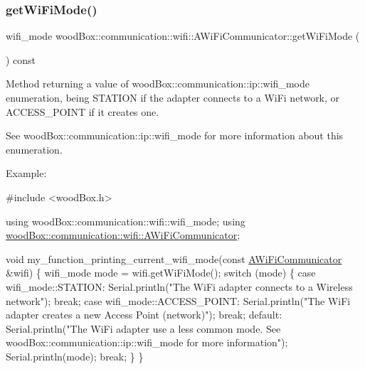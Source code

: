 \subsubsection{\texorpdfstring{get\+Wi\+Fi\+Mode()}{getWiFiMode()}}
{\footnotesize\ttfamily wifi\+\_\+mode wood\+Box\+::communication\+::wifi\+::\+A\+Wi\+Fi\+Communicator\+::get\+Wi\+Fi\+Mode (\begin{DoxyParamCaption}{ }\end{DoxyParamCaption}) const}

Method returning a value of wood\+Box\+::communication\+::ip\+::wifi\+\_\+mode enumeration, being S\+T\+A\+T\+I\+ON if the adapter connects to a Wi\+Fi network, or A\+C\+C\+E\+S\+S\+\_\+\+P\+O\+I\+NT if it creates one.

See wood\+Box\+::communication\+::ip\+::wifi\+\_\+mode for more information about this enumeration.

Example\+:


\begin{DoxyCode}
\textcolor{preprocessor}{#include <woodBox.h>}

\textcolor{keyword}{using} woodBox::communication::wifi::wifi\_mode;
\textcolor{keyword}{using} \mbox{\hyperlink{classwood_box_1_1communication_1_1wifi_1_1_a_wi_fi_communicator}{woodBox::communication::wifi::AWiFiCommunicator}};

\textcolor{keywordtype}{void} my\_function\_printing\_current\_wifi\_mode(\textcolor{keyword}{const} \mbox{\hyperlink{classwood_box_1_1communication_1_1wifi_1_1_a_wi_fi_communicator_a9d1dc13ca9243170b04211bef2b86ed2}{AWiFiCommunicator}} &wifi) \{
  wifi\_mode mode = wifi.getWiFiMode();
  \textcolor{keywordflow}{switch} (mode) \{
    \textcolor{keywordflow}{case} wifi\_mode::STATION:
      Serial.println(\textcolor{stringliteral}{"The WiFi adapter connects to a Wireless network"});
      \textcolor{keywordflow}{break};
    \textcolor{keywordflow}{case} wifi\_mode::ACCESS\_POINT:
      Serial.println(\textcolor{stringliteral}{"The WiFi adapter creates a new Access Point (network)"});
      \textcolor{keywordflow}{break};
    \textcolor{keywordflow}{default}:
      Serial.println(\textcolor{stringliteral}{"The WiFi adapter use a less common mode. See woodBox::communication::ip::wifi\_mode
       for more information"});
      Serial.println(mode);
      \textcolor{keywordflow}{break};
  \}
\}
\end{DoxyCode}
 \mbox{\label{classwood_box_1_1communication_1_1wifi_1_1_a_wi_fi_communicator_aa2a58b4178054b3129d711f62640a6bf}} 
